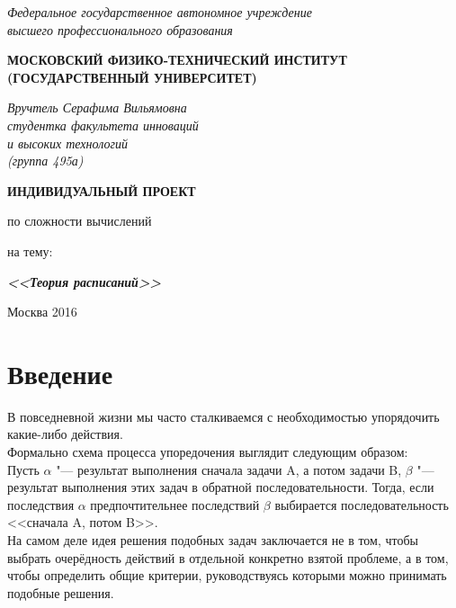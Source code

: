 \documentclass[a4paper,12pt]{article}
\theoremstyle{plain} %
\theoremstyle{definition} %
\theoremstyle{remark} %
\begin{document}

\newpage
\thispagestyle{empty} %
\begin{center}
	\textit{Федеральное государственное автономное учреждение \\
		высшего профессионального образования}
	\vspace{0.5ex}
	
	\textbf{МОСКОВСКИЙ ФИЗИКО-ТЕХНИЧЕСКИЙ ИНСТИТУТ \\ (ГОСУДАРСТВЕННЫЙ УНИВЕРСИТЕТ)}
\end{center}
\vspace{13ex}
\begin{flushright} %
	\noindent %
	\textit{Вручтель Серафима Вильямовна}
	\\
	\textit{студентка факультета инноваций}
	\\
	\textit{и высоких технологий}
	\\
	\textit{(группа 495а)}
\end{flushright}
\begin{center}
	\vspace{13ex}
	\textbf{ИНДИВИДУАЛЬНЫЙ ПРОЕКТ}
	\vspace{1ex}
	
	по сложности вычислений
	
	
	на тему:
	
	\textbf{\textit{<<Теория расписаний>>}}
	
	\vfill
	Москва 2016
\end{center}


\newpage

\section{Введение}

В повседневной жизни мы часто сталкиваемся с необходимостью упорядочить какие-либо действия. \\
Формально схема процесса упоредочения выглядит следующим образом: \\
Пусть $\alpha$ "--- результат выполнения сначала задачи A, а потом задачи B, $\beta$ "--- результат выполнения этих задач в обратной последовательности. Тогда, если последствия $\alpha$ предпочтительнее последствий $\beta$ выбирается последовательность <<сначала A, потом B>>. \\
На самом деле идея решения подобных задач заключается не в том, чтобы выбрать очерёдность действий в отдельной конкретно взятой проблеме, а в том, чтобы определить общие критерии, руководствуясь которыми можно принимать подобные решения.
\end{document}
